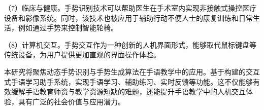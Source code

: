（7）临床与健康。手势识别技术可以帮助医生在手术室内实现非接触式操控医疗设备和影像系统\cite{strickland2013using}。同时，该技术也被应用于辅助行动不便人士的康复训练和日常生活，例如通过手势来控制智能轮椅\cite{zeng2012natural}。

（8）计算机交互。手势交互作为一种创新的人机界面形式，能够取代鼠标键盘等传统设备，为用户提供更加直观的界面操作体验\cite{starner1998real}。

本研究将聚焦动态手势识别与手势生成算法在手语教学中的应用。基于构建的交互式手语学习助手系统，实现手语学习、辅助练习、实时反馈等功能。这不仅能够有效缓解手语教育师资与教学资源短缺的难题，还能提升手语教学中的人机交互体验，具有广泛的社会价值与应用潜力。




